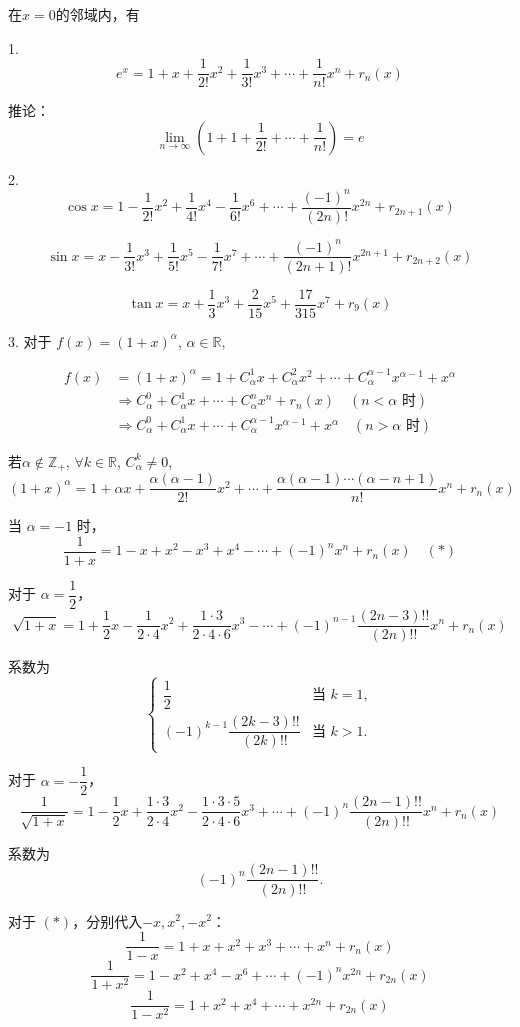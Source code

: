 \begin{proposition}
	在$x=0$的邻域内，有
	
	1.
	\[
	e^x = 1 + x + \frac{1}{2!}x^2 + \frac{1}{3!}x^3 + \cdots + \frac{1}{n!}x^n + r_n(x)
	\]
	
	推论：
	\[
	\lim_{n \to \infty} \left(1 + 1 + \frac{1}{2!} + \cdots + \frac{1}{n!}\right) = e
	\]
	
	2.
	\[
	\cos x = 1 - \frac{1}{2!}x^2 + \frac{1}{4!}x^4 - \frac{1}{6!}x^6 + \cdots + \frac{(-1)^n}{(2n)!}x^{2n} + r_{2n+1}(x)
	\]
	
	\[
	\sin x = x - \frac{1}{3!}x^3 + \frac{1}{5!}x^5 - \frac{1}{7!}x^7 + \cdots + \frac{(-1)^n}{(2n+1)!}x^{2n+1} + r_{2n+2}(x)
	\]
	
	\[
	\tan x = x + \frac{1}{3}x^3 + \frac{2}{15}x^5 + \frac{17}{315}x^7 + r_9(x)
	\]
	
	3. 对于 $f(x) = (1+x)^\alpha$, $\alpha \in \mathbb{R}$,
	
	\[\begin{aligned}
		f(x) &= (1+x)^\alpha = 1 + C_\alpha^1 x + C_\alpha^2 x^2 + \cdots + C_\alpha^{\alpha-1} x^{\alpha-1} + x^\alpha\\
		&\Rightarrow C_\alpha^0 + C_\alpha^1 x + \cdots + C_\alpha^n x^n + r_n(x) \quad (n < \alpha \text{ 时})\\
		&\Rightarrow C_\alpha^0 + C_\alpha^1 x + \cdots + C_\alpha^{\alpha-1} x^{\alpha-1} + x^\alpha \quad (n > \alpha \text{ 时})
	\end{aligned}	\]
	
	
	若$ \alpha \notin \mathbb{Z}_+$, $\forall k \in \mathbb{R}$, $C_\alpha^k \neq 0$,
	\[
	(1+x)^\alpha = 1 + \alpha x + \frac{\alpha(\alpha-1)}{2!}x^2 + \cdots + \frac{\alpha(\alpha-1)\cdots(\alpha-n+1)}{n!}x^n + r_n(x)
	\]
	
	当 $\alpha = -1$ 时，
	\[
	\frac{1}{1+x} = 1 - x + x^2 - x^3 + x^4 - \cdots + (-1)^n x^n + r_n(x)\quad(*)
	\]
	
	对于 $\alpha = \dfrac{1}{2}$，
	\[
	\sqrt{1+x} = 1 + \frac{1}{2}x - \frac{1}{2 \cdot 4}x^2 + \frac{1 \cdot 3}{2 \cdot 4 \cdot 6}x^3 - \cdots + (-1)^{n-1} \frac{(2n-3)!!}{(2n)!!}x^n + r_n(x)
	\]
	
	系数为
	\[
	\begin{cases}
		\dfrac{1}{2} & \text{当 } k=1, \\
		(-1)^{k-1} \dfrac{(2k-3)!!}{(2k)!!} & \text{当 } k > 1.
	\end{cases}
	\]
	
	对于 $\alpha = -\dfrac{1}{2}$，
	\[
	\frac{1}{\sqrt{1+x}} = 1 - \frac{1}{2}x + \frac{1 \cdot 3}{2 \cdot 4}x^2 - \frac{1 \cdot 3 \cdot 5}{2 \cdot 4 \cdot 6}x^3 + \cdots + (-1)^n \frac{(2n-1)!!}{(2n)!!}x^n + r_n(x)
	\]
	
	系数为
	\[
	(-1)^n \frac{(2n-1)!!}{(2n)!!}.
	\]
	
	对于 $(*)$，分别代入$-x,x^2,-x^2$：
	\[
	\frac{1}{1-x} = 1 + x + x^2 + x^3 + \cdots + x^n + r_n(x)
	\]
	\[
	\frac{1}{1+x^2} = 1 - x^2 + x^4 - x^6 + \cdots + (-1)^n x^{2n} + r_{2n}(x)
	\]
	\[
	\frac{1}{1-x^2} = 1 + x^2 + x^4 + \cdots + x^{2n} + r_{2n}(x)
	\]
\end{proposition}
